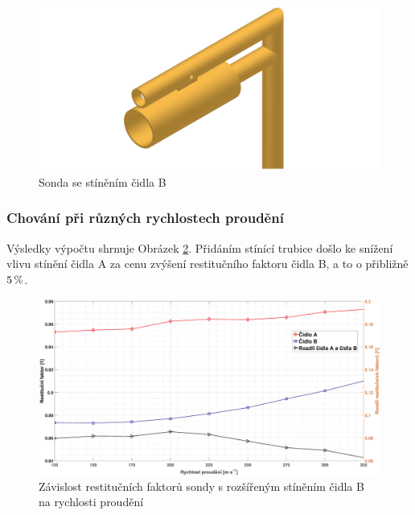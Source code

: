         \begin{figure}[ht!]
            \centering
            \includegraphics[width=\textwidth]{400_SIMULACE_KONSTRUKCNICH_UPRAV/Vykresy_rendery/Sonda_s_rozsirenym_stinenim_B.png}
            \caption{Sonda se stíněním čidla B}
            \label{fig:sonda-s-rozsirenym-stinenim-B}
        \end{figure}
        
        \subsubsection{Chování při různých rychlostech proudění}
            Výsledky výpočtu shrnuje Obrázek \ref{fig:sonda-s-rosirenym-stinenim-rychlosti}. Přidáním stínící trubice došlo ke snížení vlivu stínění čidla A za cenu zvýšení restitučního faktoru čidla B, a to o přibližně $5 \, \%$.
            
            \begin{figure}[ht!]
                \centering
                \includegraphics*[width=\textwidth]{400_SIMULACE_KONSTRUKCNICH_UPRAV/Grafy/03_rychlosti.eps}
                \caption{Závislost restitučních faktorů sondy s rozšířeným stíněním čidla B na rychlosti proudění}
                \label{fig:sonda-s-rosirenym-stinenim-rychlosti}
            \end{figure}

